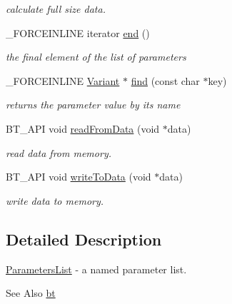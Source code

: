 \begin{DoxyCompactItemize}
\begin{DoxyCompactList}\small\item\em calculate full size data. \end{DoxyCompactList}\item 
\hypertarget{classbt_1_1_parameters_list_a9516b454245ff81e56fb02f69179a511}{\-\_\-\-F\-O\-R\-C\-E\-I\-N\-L\-I\-N\-E iterator \hyperlink{classbt_1_1_parameters_list_a9516b454245ff81e56fb02f69179a511}{end} ()}\label{classbt_1_1_parameters_list_a9516b454245ff81e56fb02f69179a511}

\begin{DoxyCompactList}\small\item\em the final element of the list of parameters \end{DoxyCompactList}\item 
\hypertarget{classbt_1_1_parameters_list_a6434a733eda5709f1571bc51859a7b33}{\-\_\-\-F\-O\-R\-C\-E\-I\-N\-L\-I\-N\-E \hyperlink{classbt_1_1_variant}{Variant} $\ast$ \hyperlink{classbt_1_1_parameters_list_a6434a733eda5709f1571bc51859a7b33}{find} (const char $\ast$key)}\label{classbt_1_1_parameters_list_a6434a733eda5709f1571bc51859a7b33}

\begin{DoxyCompactList}\small\item\em returns the parameter value by its name \end{DoxyCompactList}\item 
\hypertarget{classbt_1_1_parameters_list_a45980676a4ce9b8f7205a574cb5ea005}{B\-T\-\_\-\-A\-P\-I void \hyperlink{classbt_1_1_parameters_list_a45980676a4ce9b8f7205a574cb5ea005}{read\-From\-Data} (void $\ast$data)}\label{classbt_1_1_parameters_list_a45980676a4ce9b8f7205a574cb5ea005}

\begin{DoxyCompactList}\small\item\em read data from memory. \end{DoxyCompactList}\item 
\hypertarget{classbt_1_1_parameters_list_ac40f19cb50e7a480a672c06314156268}{B\-T\-\_\-\-A\-P\-I void \hyperlink{classbt_1_1_parameters_list_ac40f19cb50e7a480a672c06314156268}{write\-To\-Data} (void $\ast$data)}\label{classbt_1_1_parameters_list_ac40f19cb50e7a480a672c06314156268}

\begin{DoxyCompactList}\small\item\em write data to memory. \end{DoxyCompactList}\end{DoxyCompactItemize}


\subsection{Detailed Description}
\hyperlink{classbt_1_1_parameters_list}{Parameters\-List} -\/ a named parameter list. 

\begin{DoxySeeAlso}{See Also}
\hyperlink{namespacebt}{bt} 
\end{DoxySeeAlso}
